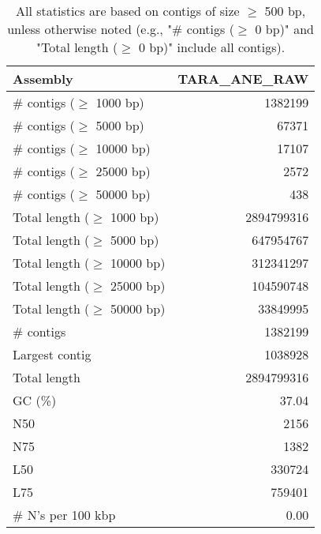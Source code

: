 \documentclass[12pt,a4paper]{article}
\begin{document}
\begin{table}[ht]
\begin{center}
\caption{All statistics are based on contigs of size $\geq$ 500 bp, unless otherwise noted (e.g., "\# contigs ($\geq$ 0 bp)" and "Total length ($\geq$ 0 bp)" include all contigs).}
\begin{tabular}{|l*{1}{|r}|}
\hline
Assembly & TARA\_ANE\_RAW \\ \hline
\# contigs ($\geq$ 1000 bp) & 1382199 \\ \hline
\# contigs ($\geq$ 5000 bp) & 67371 \\ \hline
\# contigs ($\geq$ 10000 bp) & 17107 \\ \hline
\# contigs ($\geq$ 25000 bp) & 2572 \\ \hline
\# contigs ($\geq$ 50000 bp) & 438 \\ \hline
Total length ($\geq$ 1000 bp) & 2894799316 \\ \hline
Total length ($\geq$ 5000 bp) & 647954767 \\ \hline
Total length ($\geq$ 10000 bp) & 312341297 \\ \hline
Total length ($\geq$ 25000 bp) & 104590748 \\ \hline
Total length ($\geq$ 50000 bp) & 33849995 \\ \hline
\# contigs & 1382199 \\ \hline
Largest contig & 1038928 \\ \hline
Total length & 2894799316 \\ \hline
GC (\%) & 37.04 \\ \hline
N50 & 2156 \\ \hline
N75 & 1382 \\ \hline
L50 & 330724 \\ \hline
L75 & 759401 \\ \hline
\# N's per 100 kbp & 0.00 \\ \hline
\end{tabular}
\end{center}
\end{table}
\end{document}
